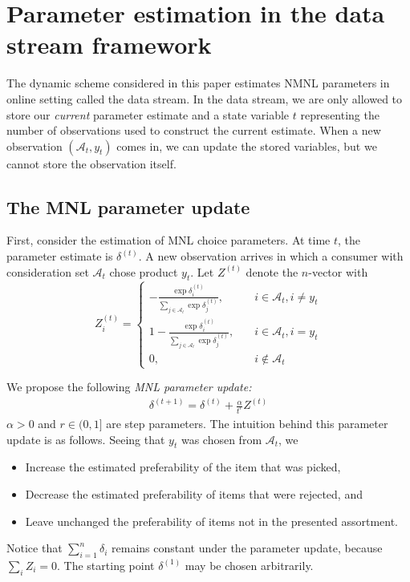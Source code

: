 \documentclass[preprint,12pt,authoryear]{elsarticle}
\begin{document}
\section{Parameter estimation in the data stream framework}
The dynamic scheme considered in this paper estimates NMNL parameters in online setting called the data stream. In the data stream, we are only allowed to store our \emph{current} parameter estimate and a state variable $t$ representing the number of observations used to construct the current estimate. When a new observation $(\mathcal{A}_t, y_t)$ comes in, we can update the stored variables, but we cannot store the observation itself. %

\subsection{The MNL parameter update}
First, consider the estimation of MNL choice parameters. At time $t$, the parameter estimate is $\delta^{(t)}$. A new observation arrives in which a consumer with consideration set $\mathcal{A}_t$ chose product $y_t$. Let $Z^{(t)}$ denote the $n$-vector with
\begin{equation}Z^{(t)}_i =
\begin{cases}
 - \frac{\exp \delta^{(t)}_i}{\sum_{j\in \mathcal{A}_t} \exp \delta^{(t)}_j}, \quad& i \in \mathcal{A}_t, i\neq y_t \\
1 - \frac{\exp \delta^{(t)}_i}{\sum_{j\in \mathcal{A}_t} \exp \delta^{(t)}_j} , \quad& i \in \mathcal{A}_t, i =  y_t \\
0, \quad & i \notin \mathcal{A}_t
\end{cases}
\end{equation}

We propose the following \emph{MNL parameter update:}
\begin{align} \label{mnlparameterupdate}
\delta^{(t+1)} = \delta^{(t)} + \frac{\alpha}{t^r} Z^{(t)}
\end{align}
$\alpha >0$ and $r \in (0, 1]$ are step parameters. The intuition behind this parameter update is as follows. Seeing that $y_t$ was chosen from $\mathcal{A}_t$, we 
\begin{itemize}
\item Increase the estimated preferability of the item that was picked,
\item Decrease the estimated preferability of items that were rejected, and
\item Leave unchanged the preferability of items not in the presented assortment.
\end{itemize}
Notice that $\sum_{i=1}^n \delta_i$ remains constant under the parameter update, because $\sum_i Z_i = 0$. The starting point $\delta^{(1)}$ may be chosen arbitrarily.
\end{document}
